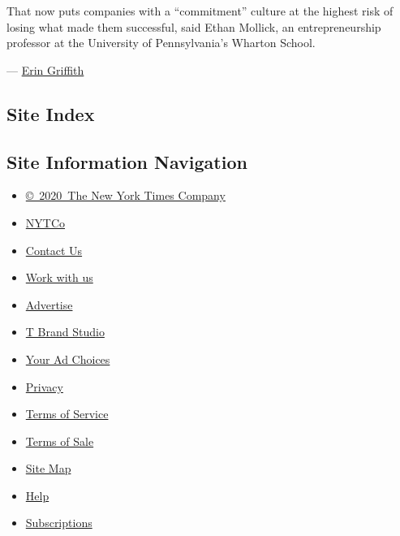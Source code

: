 That now puts companies with a ``commitment'' culture at the highest
risk of losing what made them successful, said Ethan Mollick, an
entrepreneurship professor at the University of Pennsylvania's Wharton
School.

--- \href{https://www.nytimes.com/by/erin-griffith}{Erin Griffith}

\hypertarget{site-index}{%
\subsection{Site Index}\label{site-index}}

\hypertarget{site-information-navigation}{%
\subsection{Site Information
Navigation}\label{site-information-navigation}}

\begin{itemize}
\tightlist
\item
  \href{https://help.nytimes.com/hc/en-us/articles/115014792127-Copyright-notice}{©~2020~The
  New York Times Company}
\end{itemize}

\begin{itemize}
\tightlist
\item
  \href{https://www.nytco.com/}{NYTCo}
\item
  \href{https://help.nytimes.com/hc/en-us/articles/115015385887-Contact-Us}{Contact
  Us}
\item
  \href{https://www.nytco.com/careers/}{Work with us}
\item
  \href{https://nytmediakit.com/}{Advertise}
\item
  \href{http://www.tbrandstudio.com/}{T Brand Studio}
\item
  \href{https://www.nytimes.com/privacy/cookie-policy\#how-do-i-manage-trackers}{Your
  Ad Choices}
\item
  \href{https://www.nytimes.com/privacy}{Privacy}
\item
  \href{https://help.nytimes.com/hc/en-us/articles/115014893428-Terms-of-service}{Terms
  of Service}
\item
  \href{https://help.nytimes.com/hc/en-us/articles/115014893968-Terms-of-sale}{Terms
  of Sale}
\item
  \href{https://spiderbites.nytimes.com}{Site Map}
\item
  \href{https://help.nytimes.com/hc/en-us}{Help}
\item
  \href{https://www.nytimes.com/subscription?campaignId=37WXW}{Subscriptions}
\end{itemize}
